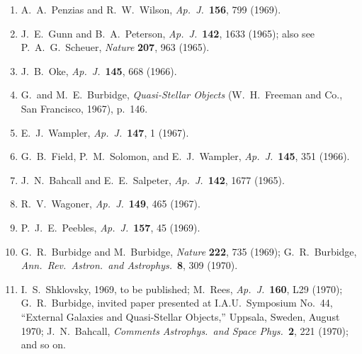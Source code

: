 \begin{enumerate}
  \item{}\label{ch15-ref-33}
  A.~A.~Penzias and R.~W.~Wilson,
  \emph{Ap.\ J.}\ \textbf{156}, 799 (1969).

  \item{}\label{ch15-ref-34}
  J.~E.~Gunn and B.~A.~Peterson,
  \emph{Ap.\ J.}\ \textbf{142}, 1633 (1965);
  also see P.~A.~G.~Scheuer, \emph{Nature} \textbf{207}, 963 (1965).

  \item{}\label{ch15-ref-35}
  J.~B.~Oke, \emph{Ap.\ J.}\ \textbf{145}, 668 (1966).

  \item{}\label{ch15-ref-36}
  G.\ and M.~E.~Burbidge, \emph{Quasi-Stellar Objects}
  (W.~H.~Freeman and Co., San Francisco, 1967), p.~146.

  \item{}\label{ch15-ref-37}
  E.~J.~Wampler, \emph{Ap.\ J.}\ \textbf{147}, 1 (1967).

  \item{}\label{ch15-ref-38}
  G.~B.~Field, P.~M.~Solomon, and E.~J.~Wampler,
  \emph{Ap.\ J.}\ \textbf{145}, 351 (1966).

  \item{}\label{ch15-ref-39}
  J.~N.~Bahcall and E.~E.~Salpeter,
  \emph{Ap.\ J.}\ \textbf{142}, 1677 (1965).

  \item{}\label{ch15-ref-40}
  R.~V.~Wagoner, \emph{Ap.\ J.}\ \textbf{149}, 465 (1967).

  \item{}\label{ch15-ref-41}
  P.~J.~E.~Peebles, \emph{Ap.\ J.}\ \textbf{157}, 45 (1969).

  \item{}\label{ch15-ref-42}
  G.~R.~Burbidge and M.~Burbidge,
  \emph{Nature} \textbf{222}, 735 (1969);
  G.~R.~Burbidge, \emph{Ann.\ Rev.\ Astron.\ and Astrophys.}\
  \textbf{8}, 309 (1970).

  \item{}\label{ch15-ref-43}
  I.~S.~Shklovsky, 1969, to be published;
  M.~Rees, \emph{Ap.\ J.}\ \textbf{160}, L29 (1970);
  G.~R.~Burbidge, invited paper presented at I.A.U.\ Symposium No.~44,
  ``External Galaxies and Quasi-Stellar Objects,'' Uppsala, Sweden,
  August 1970; J.~N.~Bahcall,
  \emph{Comments Astrophys.\ and Space Phys.}\ \textbf{2}, 221 (1970);
  and so on.


\end{enumerate}
